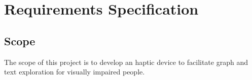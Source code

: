 \chapter{Requirements Specification}

\section{Scope}

The scope of this project is to develop an haptic device to facilitate graph and text exploration for visually impaired people. 
